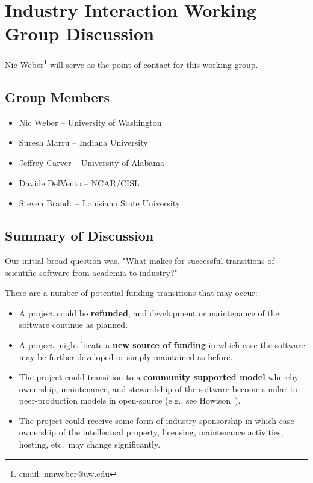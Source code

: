 \section{Industry Interaction Working Group Discussion}
\label{sec:appendix_industry_interaction}

Nic Weber\footnote{email: \href{mailto:nmweber@uw.edu}{nmweber@uw.edu}} will serve as the point of contact for this working group.

\subsection{Group Members}

\begin{itemize}
\item Nic Weber -- University of Washington
\item Suresh Marru -- Indiana University
\item Jeffrey Carver -- University of Alabama
\item Davide DelVento -- NCAR/CISL
\item Steven Brandt -- Louisiana State University
\end{itemize} 

\subsection{Summary of Discussion}

Our initial broad question was, "What makes for successful transitions of scientific software from academia to industry?"

There are a number of potential funding transitions that may occur:  
%
\begin{itemize}

\item A project could be \textbf{refunded}, and development or maintenance of
the software continue as planned.

\item A project might locate a \textbf{new source of funding} in which case the
software may be further developed or simply maintained as before.

\item The project could transition to a \textbf{community supported model}
whereby ownership, maintenance, and stewardship of the software become similar
to peer-production models in open-source (e.g., see
Howison~\cite{howison_sustaining_2015}).

\item The project could receive some form of industry sponsorship in which case
ownership of the intellectual property, licensing, maintenance activities,
hosting, etc.\ may change significantly.

\end{itemize}

